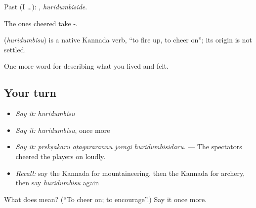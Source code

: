 Past (I …): , \emph{huridumbiside}.

The ones cheered take -.

\begin{cousinweb}
\textbf{} (\emph{huridumbisu}) is a native Kannada verb, \textquotedblleft{}to fire up, to cheer on\textquotedblright{}; its origin is not settled.
\end{cousinweb}

\begin{grammarlens}[title={What you've built}]
One more word for describing what you lived and felt.
\end{grammarlens}

\subsection*{Your turn}
\begin{itemize}
\raggedright
  \item \emph{Say it:} \emph{huridumbisu}
  \item \emph{Say it:} \emph{huridumbisu}, once more
  \item \emph{Say it:} \emph{prēkṣakaru āṭagārarannu jōrāgi huridumbisidaru.} — The spectators cheered the players on loudly.
  \item \emph{Recall:} say the Kannada for mountaineering, then the Kannada for archery, then say \emph{huridumbisu} again
\end{itemize}

\begin{tcolorbox}[breakable,colback=teal!4,colframe=teal!35!black,title={Before you move on}]
What does  mean? (\textquotedblleft{}To cheer on; to encourage\textquotedblright{}.) Say it once more.
\end{tcolorbox}
